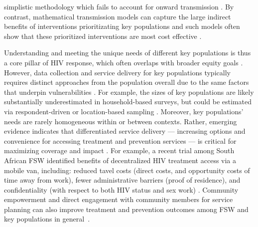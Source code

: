 simplistic methodology which fails to account for onward transmission \cite{Mishra2014mot}.
By contrast, mathematical transmission models can capture the large indirect benefits of
interventions prioritizating key populations \cite{Mishra2014mot,Long2021}
and such models often show that these prioritized interventions are most cost effective
\cite{Stuart2018,Maheu-Giroux2019,Johnson2019}.
\par
Understanding and meeting the unique needs of different key populations is thus
a core pillar of HIV response, which often overlaps with broader equity goals
\cite{Shannon2015,Beyrer2015,Beyrer2016}.
However, data collection and service delivery for key populations typically requires
distinct approaches from the population overall
due to the same factors that underpin vulnerabilities \cite{UNAIDS2010kps,WHO2016kp}.
For example, the sizes of key populations
are likely substantially underestimated in household-based surveys,
but could be estimated via respondent-driven or location-based sampling
\cite{UNAIDS2010kps,Lowndes2012,Abdul-Quader2014}.
Moreover, key populations' needs are rarely homogeneous within or between contexts.
Rather, emerging evidence indicates that differentiated service delivery
--- \ie increasing options and convenience for accessing treatment and prevention services ---
is critical for maximizing coverage and impact \cite{Grimsrud2016,Ehrenkranz2019,Huber2021}.
For example, a recent trial among South African FSW identified benefits of
decentralized HIV treatment access via a mobile van, including:
reduced tavel costs (direct costs, and opportunity costs of time away from work),
fewer administrative barriers (\eg proof of residence), and
confidentiality (with respect to both HIV status and sex work) \cite{Comins2022}.
Community empowerment and direct engagement with community members for service planning
can also improve treatment and prevention outcomes
among FSW and key populations in general~\cite{Atuhaire2021}.
